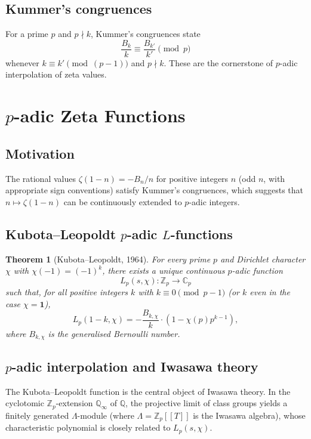 \documentclass[12pt,a4paper]{amsart}
\newtheorem{theorem}{Theorem}[section]
\theoremstyle{definition}
\theoremstyle{remark}
\begin{document}
\subsection{Kummer's congruences}

For a prime $p$ and $p \nmid k$, Kummer's congruences state
\[
  \frac{B_k}{k} \equiv \frac{B_{k'}}{k'} \pmod{p}
\]
whenever $k \equiv k' \pmod{(p-1)}$ and $p \nmid k$.
These are the cornerstone of $p$-adic interpolation of zeta values.

\section{$p$-adic Zeta Functions}

\subsection{Motivation}

The rational values $\zeta(1-n) = -B_n/n$ for positive integers $n$ (odd $n$,
with appropriate sign conventions) satisfy Kummer's congruences, which suggests
that $n \mapsto \zeta(1-n)$ can be continuously extended to $p$-adic integers.

\subsection{Kubota--Leopoldt $p$-adic $L$-functions}

\begin{theorem}[Kubota--Leopoldt, 1964]
  For every prime $p$ and Dirichlet character $\chi$ with $\chi(-1) = (-1)^k$,
  there exists a unique continuous $p$-adic function
  \[
    L_p(s, \chi): \mathbb{Z}_p \to \mathbb{C}_p
  \]
  such that, for all positive integers $k$ with $k \equiv 0 \pmod{p-1}$ (or
  $k$ even in the case $\chi = \mathbf{1}$),
  \[
    L_p(1-k, \chi) = -\frac{B_{k,\chi}}{k} \cdot \left(1 - \chi(p) p^{k-1}\right),
  \]
  where $B_{k,\chi}$ is the generalised Bernoulli number.
\end{theorem}

\subsection{$p$-adic interpolation and Iwasawa theory}

The Kubota--Leopoldt function is the central object of Iwasawa theory. In the
cyclotomic $\mathbb{Z}_p$-extension $\mathbb{Q}_\infty$ of $\mathbb{Q}$, the
projective limit of class groups yields a finitely generated $\Lambda$-module
(where $\Lambda = \mathbb{Z}_p[[T]]$ is the Iwasawa algebra), whose characteristic
polynomial is closely related to $L_p(s, \chi)$.
\end{document}
